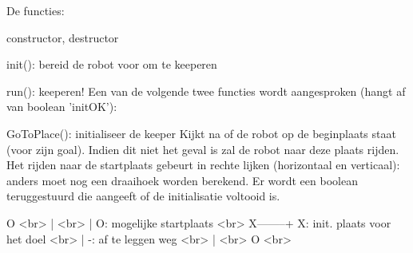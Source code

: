 \begin{DoxyItemize}
\item De functies\-:
\begin{DoxyItemize}
\item constructor, destructor
\item init()\-: bereid de robot voor om te keeperen
\item run()\-: keeperen! Een van de volgende twee functies wordt aangesproken (hangt af van boolean 'init\-O\-K')\-:
\item Go\-To\-Place()\-: initialiseer de keeper Kijkt na of de robot op de beginplaats staat (voor zijn goal). Indien dit niet het geval is zal de robot naar deze plaats rijden. Het rijden naar de startplaats gebeurt in rechte lijken (horizontaal en verticaal)\-: anders moet nog een draaihoek worden berekend. Er wordt een boolean teruggestuurd die aangeeft of de initialisatie voltooid is. \begin{DoxyVerb}             O                                                                                    <br>
             |                                                                                    <br>
             |              O: mogelijke startplaats                                          <br>
    X--------+              X: init. plaats voor het doel                                     <br>
             |              -: af te leggen weg                                                   <br>
             |                                                                                    <br>
             O                                                                                    <br>
\end{DoxyVerb}

\end{DoxyItemize}



\end{DoxyItemize}

